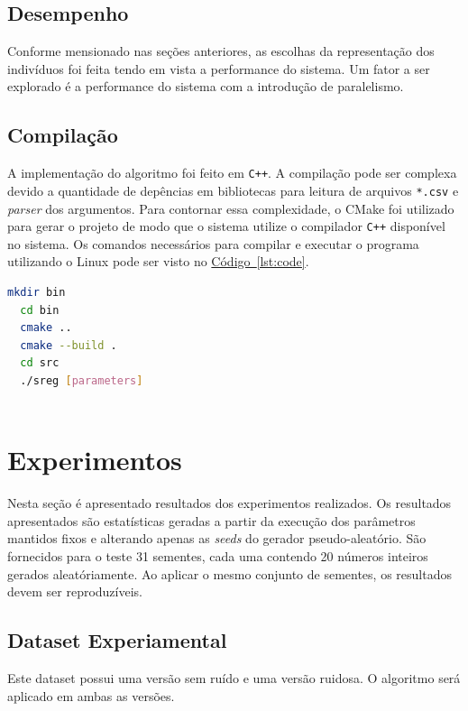 \documentclass[a4paper]{article}
\begin{document}
\subsection{Desempenho}

Conforme mensionado nas seções anteriores, as escolhas da representação dos
indivíduos foi feita tendo em vista a performance do sistema. Um fator a ser
explorado é a performance do sistema com a introdução de paralelismo.

\subsection{Compilação}
A implementação do algoritmo foi feito em \texttt{C++}. A compilação pode ser
complexa devido a quantidade de depências em bibliotecas para leitura de
arquivos \texttt{*.csv} e \textit{parser} dos argumentos. Para contornar essa
complexidade, o CMake foi utilizado para gerar o projeto de modo que o sistema
utilize o compilador \texttt{C++} disponível no sistema. Os comandos necessários
para compilar e executar o programa utilizando o Linux pode ser visto no
\hyperref[lst:code]{Código~\ref*{lst:code}}.

\begin{lstlisting}[language=bash, caption={Comandos para compilar utilizando o Linux},
    label={lst:code}, frame=shadowbox, frameround=fttt]
  mkdir bin 
  cd bin    
  cmake ..  
  cmake --build .  
  cd src           
  ./sreg [parameters]
                    
\end{lstlisting}

\section{Experimentos}
Nesta seção é apresentado resultados dos experimentos realizados. Os resultados
apresentados são estatísticas geradas a partir da execução dos parâmetros
mantidos fixos e alterando apenas as \textit{seeds} do gerador
pseudo-aleatório. São fornecidos para o teste 31 sementes, cada uma contendo 20
números inteiros gerados aleatóriamente.  Ao aplicar o mesmo conjunto de
sementes, os resultados devem ser reproduzíveis.

\subsection{Dataset Experiamental}
Este dataset possui uma versão sem ruído e uma versão ruidosa. O algoritmo será
aplicado em ambas as versões.
\end{document}
